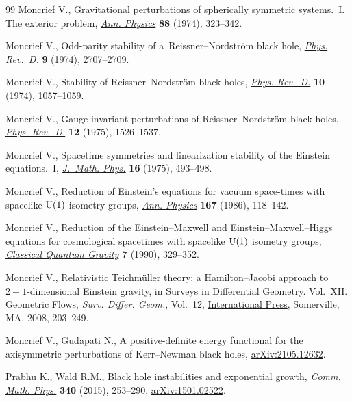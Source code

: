 \documentclass[pdftex]{sigma}
\numberwithin{equation}{section}
\begin{document}
\begin{thebibliography}{99}
Moncrief V., Gravitational perturbations of spherically symmetric systems.~{I}.
 {T}he exterior problem,
 \href{https://doi.org/10.1016/0003-4916(74)90173-0}{\textit{Ann. Physics}}
 \textbf{88} (1974), 323--342.

Moncrief V., Odd-parity stability of a~{R}eissner--{N}ordstr\"om black hole,
 \href{https://doi.org/10.1103/PhysRevD.9.2707}{\textit{Phys. Rev.~D.}}
 \textbf{9} (1974), 2707--2709.

Moncrief V., Stability of {R}eissner--{N}ordstr\"om black holes,
 \href{https://doi.org/10.1103/PhysRevD.10.1057}{\textit{Phys. Rev.~D.}}
 \textbf{10} (1974), 1057--1059.

Moncrief V., Gauge invariant perturbations of {R}eissner--{N}ordstr\"om black
 holes, \href{https://doi.org/10.1103/PhysRevD.12.1526}{\textit{Phys.
 Rev.~D.}} \textbf{12} (1975), 1526--1537.

Moncrief V., Spacetime symmetries and linearization stability of the {E}instein
 equations.~{I}, \href{https://doi.org/10.1063/1.522572}{\textit{J.~Math.
 Phys.}} \textbf{16} (1975), 493--498.

Moncrief V., Reduction of {E}instein's equations for vacuum space-times with
 spacelike {${\rm U}(1)$} isometry groups,
 \href{https://doi.org/10.1016/S0003-4916(86)80009-4}{\textit{Ann. Physics}}
 \textbf{167} (1986), 118--142.

Moncrief V., Reduction of the {E}instein--{M}axwell and
 {E}instein--{M}axwell--{H}iggs equations for cosmological spacetimes with
 spacelike {${\rm U}(1)$} isometry groups,
 \href{https://doi.org/10.1088/0264-9381/7/3/008}{\textit{Classical Quantum
 Gravity}} \textbf{7} (1990), 329--352.

Moncrief V., Relativistic {T}eichm\"uller theory: a {H}amilton--{J}acobi
 approach to {$2+1$}-dimensional {E}instein gravity, in Surveys in
 Differential Geometry. {V}ol.~{XII}. {G}eometric Flows, \textit{Surv. Differ.
 Geom.}, Vol.~12,
 \href{https://doi.org/10.4310/SDG.2007.v12.n1.a6}{International Press}, Somerville, MA, 2008, 203--249.

Moncrief V., Gudapati N., A positive-definite energy functional for the
 axisymmetric perturbations of {K}err--{N}ewman black holes,
 \href{http://arxiv.org/abs/2105.12632}{arXiv:2105.12632}.

Prabhu K., Wald R.M., Black hole instabilities and exponential growth,
 \href{https://doi.org/10.1007/s00220-015-2446-1}{\textit{Comm. Math. Phys.}}
 \textbf{340} (2015), 253--290,
 \href{http://arxiv.org/abs/1501.02522}{arXiv:1501.02522}.


\end{thebibliography}
\end{document}
